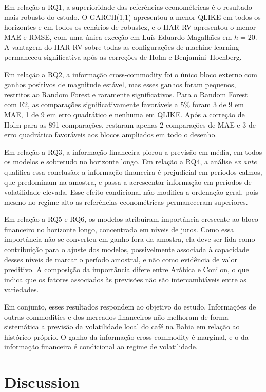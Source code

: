 \documentclass[a4paper,fleqn]{cas-sc}
\begin{document}
Em relação a RQ1, a superioridade das referências econométricas é o resultado mais robusto do estudo. O GARCH(1,1) apresentou a menor QLIKE em todos os horizontes e em todos os cenários de robustez, e o HAR-RV apresentou o menor MAE e RMSE, com uma única exceção em Luís Eduardo Magalhães em \(h=20\). A vantagem do HAR-RV sobre todas as configurações de machine learning permaneceu significativa após as correções de Holm e Benjamini--Hochberg.

Em relação a RQ2, a informação cross-commodity foi o único bloco externo com ganhos positivos de magnitude estável, mas esses ganhos foram pequenos, restritos ao Random Forest e raramente significativos. Para o Random Forest com E2, as comparações significativamente favoráveis a 5\% foram 3 de 9 em MAE, 1 de 9 em erro quadrático e nenhuma em QLIKE. Após a correção de Holm para as 891 comparações, restaram apenas 2 comparações de MAE e 3 de erro quadrático favoráveis aos blocos ampliados em todo o desenho.

Em relação a RQ3, a informação financeira piorou a previsão em média, em todos os modelos e sobretudo no horizonte longo. Em relação a RQ4, a análise \textit{ex ante} qualifica essa conclusão: a informação financeira é prejudicial em períodos calmos, que predominam na amostra, e passa a acrescentar informação em períodos de volatilidade elevada. Esse efeito condicional não modifica a ordenação geral, pois mesmo no regime alto as referências econométricas permaneceram superiores.

Em relação a RQ5 e RQ6, os modelos atribuíram importância crescente ao bloco financeiro no horizonte longo, concentrada em níveis de juros. Como essa importância não se converteu em ganho fora da amostra, ela deve ser lida como contribuição para o ajuste dos modelos, possivelmente associada à capacidade desses níveis de marcar o período amostral, e não como evidência de valor preditivo. A composição da importância difere entre Arábica e Conilon, o que indica que os fatores associados às previsões não são intercambiáveis entre as variedades.

Em conjunto, esses resultados respondem ao objetivo do estudo. Informações de outras commodities e dos mercados financeiros não melhoram de forma sistemática a previsão da volatilidade local do café na Bahia em relação ao histórico próprio. O ganho da informação cross-commodity é marginal, e o da informação financeira é condicional ao regime de volatilidade.

\section{Discussion}
\label{sec:discussion}
\end{document}
